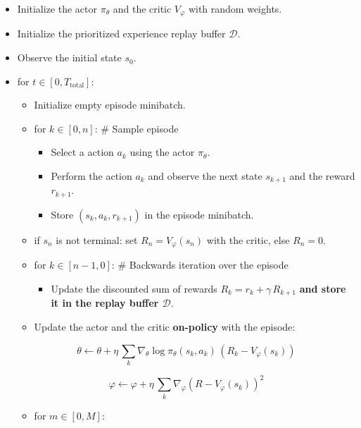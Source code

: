 \documentclass[
  letterpaper,
  DIV=11,
  numbers=noendperiod]{scrreprt}
\providecommand{\tightlist}{%
  \setlength{\itemsep}{0pt}\setlength{\parskip}{0pt}}\usepackage{longtable,booktabs,array}
\begin{document}
\begin{itemize}
\item
  Initialize the actor \(\pi_\theta\) and the critic \(V_\varphi\) with
  random weights.
\item
  Initialize the prioritized experience replay buffer \(\mathcal{D}\).
\item
  Observe the initial state \(s_0\).
\item
  for \(t \in [0, T_\text{total}]\):

  \begin{itemize}
  \item
    Initialize empty episode minibatch.
  \item
    for \(k \in [0, n]\): \# Sample episode

    \begin{itemize}
    \item
      Select a action \(a_k\) using the actor \(\pi_\theta\).
    \item
      Perform the action \(a_k\) and observe the next state \(s_{k+1}\)
      and the reward \(r_{k+1}\).
    \item
      Store \((s_k, a_k, r_{k+1})\) in the episode minibatch.
    \end{itemize}
  \item
    if \(s_n\) is not terminal: set \(R_n = V_\varphi(s_n)\) with the
    critic, else \(R_n=0\).
  \item
    for \(k \in [n-1, 0]\): \# Backwards iteration over the episode

    \begin{itemize}
    \tightlist
    \item
      Update the discounted sum of rewards
      \(R_k = r_k + \gamma \, R_{k+1}\) \textbf{and store it in the
      replay buffer \(\mathcal{D}\)}.
    \end{itemize}
  \item
    Update the actor and the critic \textbf{on-policy} with the episode:
  \end{itemize}

  \[
        \theta \leftarrow \theta + \eta \, \sum_k \nabla_\theta \log \pi_\theta(s_k, a_k) \, (R_k - V_\varphi(s_k))
    \]

  \[
        \varphi \leftarrow \varphi + \eta \, \sum_k \nabla_\varphi (R - V_\varphi(s_k))^2
    \]

  \begin{itemize}
  \item
    for \(m \in [0, M]\):


\end{itemize}
\end{itemize}
\end{document}
